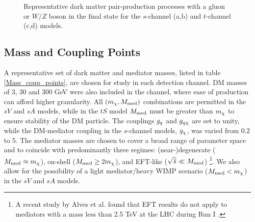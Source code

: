 \begin{figure}[t]
  \caption{Representative dark matter pair-production processes with a gluon or $W/Z$ boson in the final state for the $s$-channel (a,b) and $t$-channel (c,d) models.}
  \label{allchannel_sig_phen}
\end{figure}


\subsection{Mass and Coupling Points}  %
A representative set of dark matter and mediator masses, listed in table \ref{Mass_coup_points}, are chosen for study in each detection channel. DM masses of 3, 30 and 300 GeV were also included in the \monoZ channel, where ease of production can afford higher granularity. All $(m_{\chi}, M_{\mathrm{med}})$ combinations are permitted in the $sV$ and $sA$ models, while in the $tS$ model $M_{\mathrm{med}}$ must be greater than $m_{\chi}$ to ensure stability of the DM particle. The couplings $g_q$ and $g_{q \chi}$ are set to unity, while the DM-mediator coupling in the $s$-channel models, $g_{\chi}$, was varied from 0.2 to 5. The mediator masses are chosen to cover a broad range of parameter space and to coincide with predominantly three regimes: (near-)degenerate ($M_{\mathrm{med}} \approx m_{\chi}$), on-shell ($M_{\mathrm{med}} \geq 2 m_{\chi}$), and EFT-like ($\sqrt{\hat{s}} \ll M_{\mathrm{med}} $) \footnote{A recent study by Alves et al. found that EFT results do not apply to mediators with a mass less than 2.5 TeV at the LHC during Run I \cite{Alves:2011wf}.}. We also allow for the possibility of a light mediator/heavy WIMP scenario ($M_{\mathrm{med}} < m_{\chi}$) in the $sV$ and $sA$ models.

